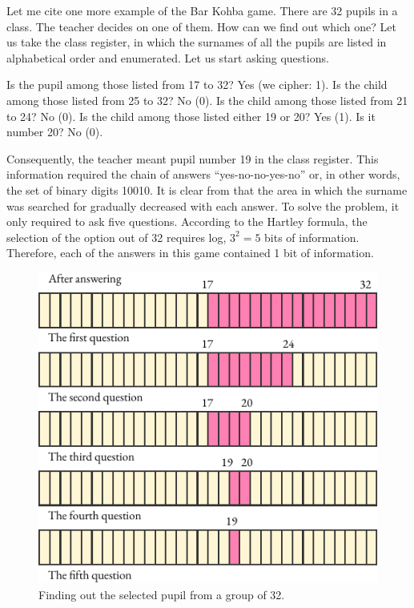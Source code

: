 Let me cite one more example of the Bar Kohba game. There are 32
pupils in a class. The teacher decides on one of them. How can we find
out which one? Let us take the class register, in which the surnames of
all the pupils are listed in alphabetical order and enumerated. Let us
start asking questions.
\begin{dialogue}
\ques Is the pupil among those listed from 17 to 32? 
\ans Yes (we cipher: 1).
\ques Is the child among those listed from 25 to 32?
\ans No (0). 
\ques Is the child among those listed from 21 to 24?
\ans No (0). 
\ques Is the child among those listed either 19 or 20?
\ans Yes (1).
\ques Is it number 20?
\ans No (0).
\end{dialogue}
Consequently, the teacher meant pupil number 19 in the class register.
This information required the chain of answers ``yes-no-no-yes-no'' or, in
other words, the set of binary digits 10010. It is clear from  that the area in which the surname was searched for gradually decreased
with each answer. To solve the problem, it only required to ask five
questions. According to the Hartley formula, the selection of the option
out of 32 requires log, $3^{2} = 5$ bits of information. Therefore, each of the
answers in this game contained 1 bit of information.
\begin{figure}[!ht]
 \centering
 \includegraphics[width=0.85\linewidth]{figures/32-pupils.pdf}
\caption{Finding out the selected pupil from a group of 32.\label{32-pupils}}
 \end{figure}

